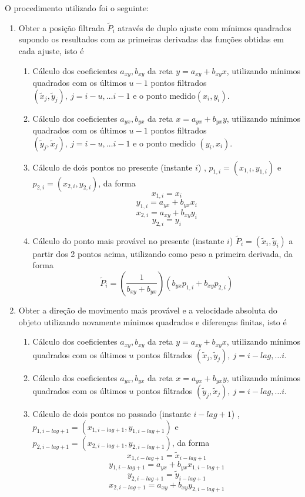 O procedimento utilizado foi o seguinte:
\begin{enumerate}
\item Obter a posição filtrada $\tilde{P}_{i}$ através de duplo ajuste
com mínimos quadrados supondo os resultados com as primeiras derivadas
das funções obtidas em cada ajuste, isto é

\begin{enumerate}
\item Cálculo dos coeficientes $a_{xy},b_{xy}$ da reta $y=a_{xy}+b_{xy}x$,
utilizando mínimos quadrados com os últimos $u-1$ pontos filtrados
$\left(\tilde{x}_{j},\tilde{y}_{j}\right),\: j=i-u,\ldots i-1$ e
o ponto medido$\left(x_{i},y_{i}\right)$. 
\item Cálculo dos coeficientes $a_{yx},b_{yx}$ da reta $x=a_{yx}+b_{yx}y$,
utilizando mínimos quadrados com os últimos $u-1$ pontos filtrados
$\left(\tilde{y}_{j},\tilde{x}_{j}\right),\: j=i-u,\ldots i-1$ e
o ponto medido $\left(y_{i},x_{i}\right)$.
\item Cálculo de dois pontos no presente (instante $i$) , $p_{1,i}=\left(x_{1,i},y_{1,i}\right)$
e $p_{2,i}=\left(x_{2,i},y_{2,i}\right)$, da forma
\[
x_{1,i}=x_{i}
\]
\[
y_{1,i}=a_{yx}+b_{yx}x_{i}
\]
\[
x_{2,i}=a_{xy}+b_{xy}y_{i}
\]
\[
y_{2,i}=y_{i}
\]

\item Cálculo do ponto mais provável no presente (instante $i$) $\tilde{P}_{i}=\left(\tilde{x}_{i},\tilde{y}_{i}\right)$
a partir dos 2 pontos acima, utilizando como peso a primeira derivada,
da forma
\[
\tilde{P}_{i}=\left(\frac{1}{b_{xy}+b_{yx}}\right)\left(b_{yx}p_{1,i}+b_{xy}p_{2,i}\right)
\]

\end{enumerate}
\item Obter a direção de movimento mais provável e a velocidade absoluta
do objeto utilizando novamente mínimos quadrados e diferenças finitas,
isto é

\begin{enumerate}
\item Cálculo dos coeficientes $a_{xy},b_{xy}$ da reta $y=a_{xy}+b_{xy}x$,
utilizando mínimos quadrados com os últimos $u$ pontos filtrados
$\left(\tilde{x}_{j},\tilde{y}_{j}\right),\: j=i-lag,\ldots i$. 
\item Cálculo dos coeficientes $a_{yx},b_{yx}$ da reta $x=a_{yx}+b_{yx}y$,
utilizando mínimos quadrados com os últimos $u$ pontos filtrados
$\left(\tilde{y}_{j},\tilde{x}_{j}\right),\: j=i-lag,\ldots i$.
\item Cálculo de dois pontos no passado (instante $i-lag+1$) , $p_{1,i-lag+1}=\left(x_{1,i-lag+1},y_{1,i-lag+1}\right)$
e $p_{2,i-lag+1}=\left(x_{2,i-lag+1},y_{2,i-lag+1}\right)$, da forma
\[
x_{1,i-lag+1}=\tilde{x}_{i-lag+1}
\]
\[
y{}_{1,i-lag+1}=a_{yx}+b_{yx}x_{1,i-lag+1}
\]
\[
y_{2,i-lag+1}=\tilde{y}_{i-lag+1}
\]
\[
x_{2,i-lag+1}=a_{xy}+b_{xy}y_{2,i-lag+1}
\]


\end{enumerate}
\end{enumerate}
